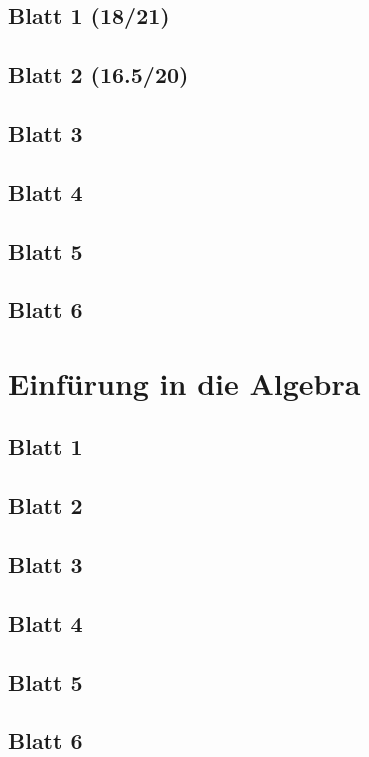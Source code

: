 \documentclass{tuftebook}
\numberwithin{Theorem}{chapter}
\theoremstyle{definition}
\theoremstyle{definition}
\begin{document}
\section{Blatt 1 (18/21)}

\section{Blatt 2 (16.5/20)}

\section{Blatt 3}

\section{Blatt 4}

\section{Blatt 5}

\section{Blatt 6}


\chapter{Einf\"{u}rung in die Algebra}
\section{Blatt 1}

\section{Blatt 2}

\section{Blatt 3}

\section{Blatt 4}

\section{Blatt 5}

\section{Blatt 6}

\end{document}
